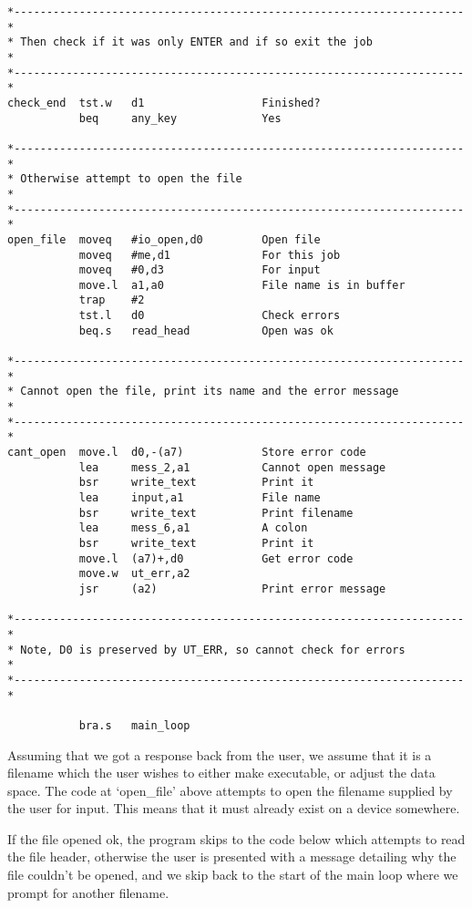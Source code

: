 \begin{lstlisting}[firstnumber=last,caption={Dataspace Program - Part 3 - Open the File}]
*---------------------------------------------------------------------*
* Then check if it was only ENTER and if so exit the job              *
*---------------------------------------------------------------------*
check_end  tst.w   d1                  Finished?
           beq     any_key             Yes

*---------------------------------------------------------------------*
* Otherwise attempt to open the file                                  *
*---------------------------------------------------------------------*
open_file  moveq   #io_open,d0         Open file
           moveq   #me,d1              For this job
           moveq   #0,d3               For input
           move.l  a1,a0               File name is in buffer
           trap    #2
           tst.l   d0                  Check errors
           beq.s   read_head           Open was ok

*---------------------------------------------------------------------*
* Cannot open the file, print its name and the error message          *
*---------------------------------------------------------------------*
cant_open  move.l  d0,-(a7)            Store error code
           lea     mess_2,a1           Cannot open message
           bsr     write_text          Print it
           lea     input,a1            File name
           bsr     write_text          Print filename
           lea     mess_6,a1           A colon
           bsr     write_text          Print it
           move.l  (a7)+,d0            Get error code
           move.w  ut_err,a2
           jsr     (a2)                Print error message

*---------------------------------------------------------------------*
* Note, D0 is preserved by UT_ERR, so cannot check for errors         *
*---------------------------------------------------------------------*

           bra.s   main_loop
\end{lstlisting}

Assuming that we got a response back from the user, we assume that
    it is a filename which the user wishes to either make executable, or
    adjust the data space. The code at `open\_file' above attempts to open the
    filename supplied by the user for input. This means that it must already
    exist on a device somewhere.

If the file opened ok, the program skips to the code below which
    attempts to read the file header, otherwise the user is presented with a
    message detailing why the file couldn't be opened, and we skip back to the
    start of the main loop where we prompt for another filename.

